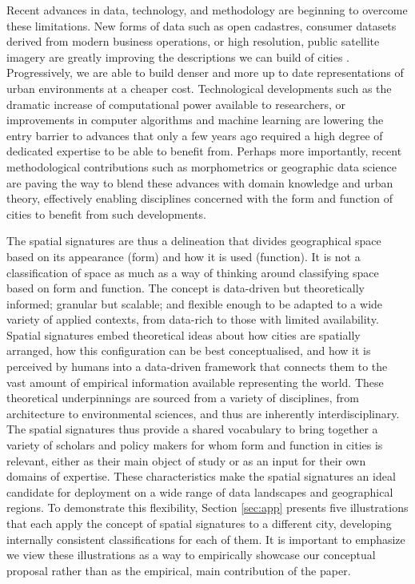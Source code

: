 Recent advances in data, technology, and methodology are beginning to overcome
these limitations.
New forms of data such as open cadastres, consumer datasets derived from
modern business operations, or high resolution, public satellite imagery are
greatly improving the descriptions we can build of cities
\citep{arribas2014accidental, glaeser2018big, wei2020multiscale, fleischmann2021evolution}. Progressively, we are able to build denser and
more up to date representations of urban environments at a cheaper cost.
Technological developments such as the dramatic increase of computational
power available to researchers, or improvements in computer algorithms and machine
learning are lowering the entry barrier to advances that only a few years ago
required a high degree of dedicated expertise to be able to benefit from.
Perhaps more importantly, recent methodological contributions such as
morphometrics \citep{dibble2016urban} or geographic data science
\citep{singleton2021geographic} are paving the way to blend these advances
with domain knowledge and urban theory, effectively enabling disciplines
concerned with the form and function of cities to benefit from such
developments.

The spatial signatures are thus a delineation that divides geographical space
based on its appearance (form) and how it is used (function).
It is not a classification of space as much as a way of thinking around
classifying space based on form and function.
The concept is data-driven but theoretically informed;
granular but scalable; and flexible enough to be adapted to a wide variety of
applied contexts, from data-rich to those with limited availability.
%
Spatial signatures embed theoretical ideas about how cities are
spatially arranged, how this configuration can be best conceptualised, and how
it is perceived by humans into a data-driven framework that connects them to the
vast amount of empirical information available representing the world.
%
These theoretical underpinnings are sourced from a variety of disciplines,
from architecture to environmental sciences, and thus are inherently
interdisciplinary.
%
The spatial signatures thus provide a shared vocabulary to bring together a
variety of scholars and policy makers for whom form and function in cities is
relevant, either as their main object of study or as an input for their own domains
of expertise.
%
These characteristics make the spatial signatures an ideal candidate
for deployment on a wide range of data landscapes and geographical regions.
To demonstrate this flexibility, Section \ref{sec:app} presents five illustrations
that each apply the concept of spatial signatures to a different city, developing
internally consistent classifications for each of them.
%
It is important to emphasize we view these illustrations as a way to empirically
showcase our conceptual proposal rather than as the empirical, main contribution of
the paper.

